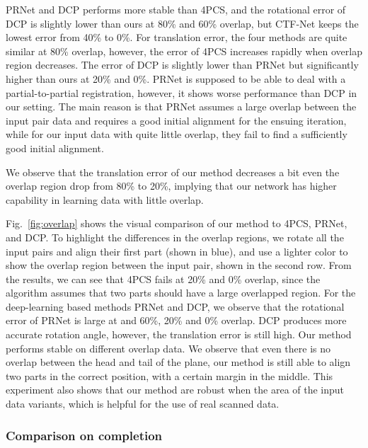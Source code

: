 

PRNet and DCP performs more stable than 4PCS,  and the rotational error of DCP is slightly lower than ours at 80\% and 60\% overlap, but CTF-Net keeps the lowest error from 40\% to 0\%.
For translation error, the four methods are quite similar at 80\% overlap, however, the error of 4PCS increases rapidly when overlap region decreases. 
The error of DCP is slightly lower than PRNet but significantly higher than ours at 20\% and 0\%.
PRNet is supposed to be able to deal with a partial-to-partial registration, however, it shows worse performance than DCP in our setting. The main reason is that PRNet assumes a large overlap between the input pair data and requires a good initial alignment for the ensuing iteration, while for our input data with quite little overlap, they fail to find a sufficiently good initial alignment.

We observe that the translation error of our method decreases a bit even the overlap region drop from 80\% to 20\%, implying that our network has higher capability in learning data with little overlap.

Fig.~\ref{fig:overlap} shows the visual comparison of our method to 4PCS, PRNet, and DCP.
To highlight the differences in the overlap regions, we rotate all the input pairs and align their first part (shown in blue), and use a lighter color to show the overlap region between the input pair, shown in the second row. %
From the results, we can see that 4PCS fails at 20\% and 0\% overlap, since the algorithm assumes that two parts should have a large overlapped region. For the deep-learning based methods PRNet and DCP, we observe that the rotational error of PRNet is large at and 60\%, 20\% and 0\% overlap. DCP produces more accurate rotation angle, however, the translation error is still high.
Our method performs stable on different overlap data. We observe that even there is no overlap between the head and tail of the plane, our method is still able to align two parts in the correct position, with a certain margin in the middle.
This experiment also shows that our method are robust when the area of the input data variants, which is helpful for the use of real scanned data.


\subsubsection{Comparison on completion}



